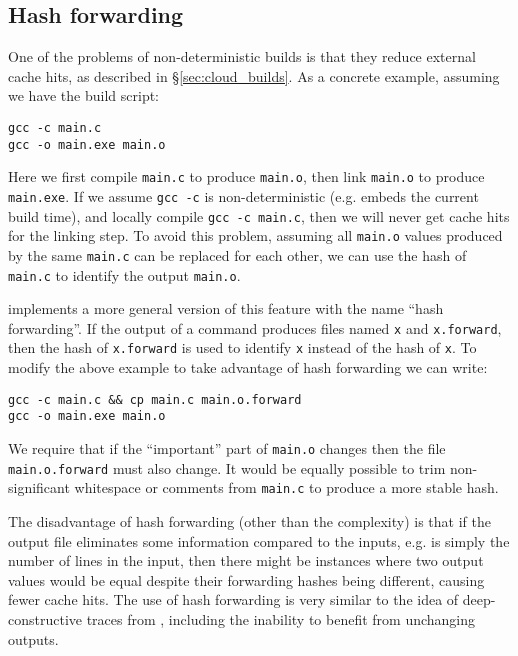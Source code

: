 \subsection{Hash forwarding}
\label{sec:forward_hashes}

One of the problems of non-deterministic builds is that they reduce external cache hits, as described in \S\ref{sec:cloud_builds}. As a concrete example, assuming we have the build script:

\begin{small}
\begin{verbatim}
gcc -c main.c
gcc -o main.exe main.o
\end{verbatim}
\end{small}

Here we first compile \texttt{main.c} to produce \texttt{main.o}, then link \texttt{main.o} to produce \texttt{main.exe}. If we assume \texttt{gcc -c} is non-deterministic (e.g. embeds the current build time), and locally compile \texttt{gcc -c main.c}, then we will never get cache hits for the linking step. To avoid this problem, assuming all \texttt{main.o} values produced by the same \texttt{main.c} can be replaced for each other, we can use the hash of \texttt{main.c} to identify the output \texttt{main.o}.

\Rattle implements a more general version of this feature with the name ``hash forwarding''. If the output of a command produces files named \texttt{x} and \texttt{x.forward}, then the hash of \texttt{x.forward} is used to identify \texttt{x} instead of the hash of \texttt{x}. To modify the above example to take advantage of hash forwarding we can write:

\begin{verbatim}
gcc -c main.c && cp main.c main.o.forward
gcc -o main.exe main.o
\end{verbatim}

We require that if the ``important'' part of \texttt{main.o} changes then the file \texttt{main.o.forward} must also change. It would be equally possible to trim non-significant whitespace or comments from \texttt{main.c} to produce a more stable hash.

The disadvantage of hash forwarding (other than the complexity) is that if the output file eliminates some information compared to the inputs, e.g. is simply the number of lines in the input, then there might be instances where two output values would be equal despite their forwarding hashes being different, causing fewer cache hits. The use of hash forwarding is very similar to the idea of deep-constructive traces from \citet[\S4.2.4]{build_systems_a_la_carte}, including the inability to benefit from unchanging outputs.


